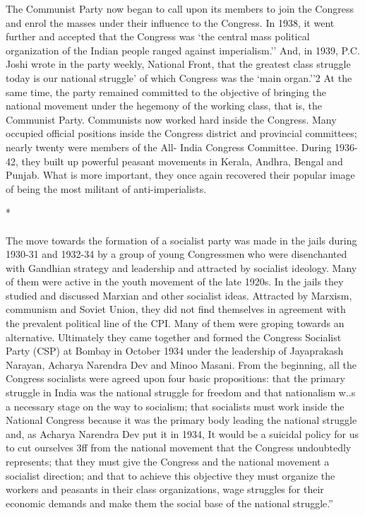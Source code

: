 The Communist Party now began to call upon its members to join the Congress and enrol the masses under their influence to the Congress. In 1938, it went further and accepted that the Congress was `the central mass political organization of the Indian people ranged against imperialism.'' And, in 1939, P.C. Joshi wrote in the party weekly, National Front, that the greatest class struggle today is our national struggle' of which Congress was the `main organ.''2 At the same time, the party remained committed to the objective of bringing the national movement under the hegemony of the working class, that is, the Communist Party. Communists now worked hard inside the Congress. Many occupied official positions inside the Congress district and provincial committees; nearly twenty were members of the All- India Congress Committee. During 1936-42, they built up powerful peasant movements in Kerala, Andhra, Bengal and Punjab. What is more important, they once again recovered their popular image of being the most militant of anti-imperialists.

\begin{center}*\end{center}

\paragraph*{}


The move towards the formation of a socialist party was made in the jails during 1930-31 and 1932-34 by a group of young Congressmen who were disenchanted with Gandhian strategy and leadership and attracted by socialist ideology. Many of them were active in the youth movement of the late 1920s. In the jails they studied and discussed Marxian and other socialist ideas. Attracted by Marxism, communism and Soviet Union, they did not find themselves in agreement with the prevalent political line of the CPI. Many of them were groping towards an alternative. Ultimately they came together and formed the Congress Socialist Party (CSP) at Bombay in October 1934 under the leadership of Jayaprakash Narayan, Acharya Narendra Dev and Minoo Masani. From the beginning, all the Congress socialists were agreed upon four basic propositions: that the primary struggle in India was the national struggle for freedom and that nationalism w..s a necessary stage on the way to socialism; that socialists must work inside the National Congress because it was the primary body leading the national struggle and, as Acharya Narendra Dev put it in 1934, It would be a suicidal policy for us to cut ourselves 3ff from the national movement that the Congress undoubtedly represents; that they must give the Congress and the national movement a socialist direction; and that to achieve this objective they must organize the workers and peasants in their class organizations, wage struggles for their economic demands and make them the social base of the national struggle.'' 

